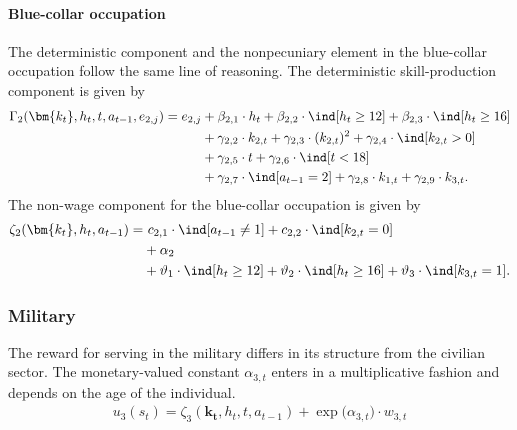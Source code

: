 \paragraph{Blue-collar occupation} The deterministic component and the nonpecuniary element in the blue-collar occupation follow the same line of reasoning. The deterministic skill-production component is given by
%
\begin{align*} 
    \Gamma_2(\bm{k_t}, h_t, t, a_{t-1}, e_{2,j}) = e_{2,j} & + \beta_{2,1} \cdot h_t + \beta_{2, 2} \cdot \ind[h_t \geq 12] + \beta_{2,3} \cdot \ind[h_t\geq 16] \\
    							 & + \gamma_{2, 2} \cdot  k_{2,t} + \gamma_{2,3} \cdot  (k_{2,t})^2 + \gamma_{2,4} \cdot  \ind[k_{2,t} > 0] \\
                                   & + \gamma_{2,5} \cdot  t + \gamma_{2,6} \cdot \ind[t < 18] \\
                                  & + \gamma_{2,7} \cdot  \ind[a_{t-1} = 2]  + \gamma_{2,8} \cdot  k_{1,t} + \gamma_{2,9} \cdot  k_{3,t}. 
\end{align*}
The non-wage component for the blue-collar occupation is given by
\begin{align*} 
\zeta_{2}( \bm{k_t}, h_t, a_{t-1} ) = &~c_{2,1} \cdot \ind[a_{t-1} \neq 1] + c_{2,2} \cdot \ind[k_{2,t} = 0] \\
                            & + \alpha_2 \\
                            & + \vartheta_1 \cdot \ind[h_t \geq 12] + \vartheta_2 \cdot \ind[h_t \geq 16] + \vartheta_3 \cdot \ind[k_{3,t} = 1].
\end{align*}


\FloatBarrier\subsubsection{Military}
The reward for serving in the military differs in its structure from the civilian sector. The monetary-valued constant $\alpha_{3,t}$ enters in a multiplicative fashion and depends on the age of the individual.
%
\begin{align}\label{eq:RewardMilitary}
    u_{3}(s_t) = \zeta_3(\bm{k_t}, h_t, t , a_{t -1})  + \exp \big( \alpha_{3, t} \big) \cdot w_{3,t}
\end{align}

